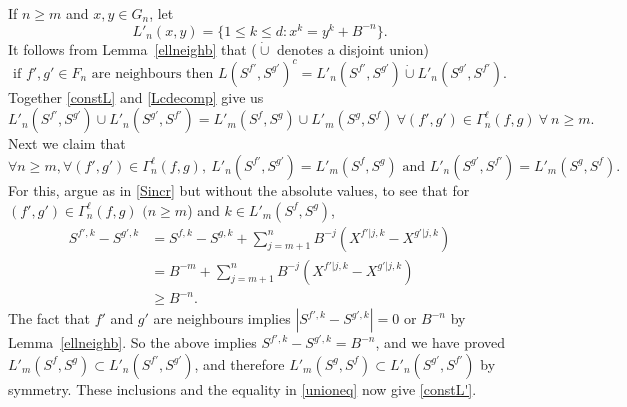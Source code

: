 \documentclass[12pt]{article}
\makeatletter
\renewenvironment{proof}[1][\proofname]{%
\par\pushQED{\qed}\normalfont%
\topsep6\p@\@plus6\p@\relax
\trivlist\item[\hskip\labelsep\bfseries#1\@addpunct{.}]%
\ignorespaces
}{%
\popQED\endtrivlist\@endpefalse
}
\numberwithin{theorem}{section}
\theoremstyle{def}
\numberwithin{equation}{section}
\makeatother
\begin{document}
\begin{proof}[Proof of Lemma~\ref{gammaext}]
If $n\ge m$ and $x,y\in G_n$, let 
\[L'_n(x,y)=\{1\le k \le d:x^k=y^k+B^{-n}\}.\]
It follows from Lemma~\ref{ellneighb} that ($\dot\cup$ denotes a disjoint union)
\begin{equation}\label{Lcdecomp}
\text{if $f',g'\in F_n$ are neighbours then $L(S^{f'},S^{g'})^c=L'_n(S^{f'},S^{g'})\dot\cup L'_n(S^{g'},S^{f'})$.}
\end{equation}
Together \eqref{constL} and \eqref{Lcdecomp} give us
\begin{equation}\label{unioneq}
L'_n(S^{f'},S^{g'})\cup L'_n(S^{g'},S^{f'})=L'_m(S^f,S^g)\cup L'_m(S^g,S^f)\ \forall (f',g')\in \Gamma_n^\ell(f,g)\ \forall \ n\ge m.
\end{equation}
Next we claim that 
\begin{equation}\label{constL'}
\forall n\ge m, \forall(f',g')\in \Gamma_n^\ell(f,g), \ L'_n(S^{f'},S^{g'})=L'_m(S^f,S^g)\text{ and }L'_n(S^{g'},S^{f'})=L'_m(S^g,S^f).
\end{equation}
For this, argue as in \eqref{Sincr} but without the absolute values, to see that for $(f',g')\in\Gamma^\ell_n(f,g)$ $(n\ge m$) and $k\in L'_m(S^f,S^g)$, 
\begin{align*}
 S^{f',k}-S^{g',k}&=S^{f,k}-S^{g,k}+\sum_{j=m+1}^n B^{-j}(X^{f'|j,k}-X^{g'|j,k})\\
&=B^{-m}+\sum_{j=m+1}^nB^{-j}(X^{f'|j,k}-X^{g'|j,k})\\
&\ge B^{-n}.
\end{align*}
The fact that $f'$ and $g'$ are neighbours implies $|S^{f',k}-S^{g',k}|=0$ or $B^{-n}$ by Lemma~\ref{ellneighb}. So the above implies $S^{f',k}-S^{g',k}=B^{-n}$, and we have proved $L'_m(S^f,S^g)\subset L'_n(S^{f'},S^{g'})$, and therefore $L'_m(S^g,S^f)\subset L'_n(S^{g'},S^{f'})$ by symmetry.  
These inclusions and the equality in \eqref{unioneq} now give \eqref{constL'}.


\end{proof}
\end{document}
